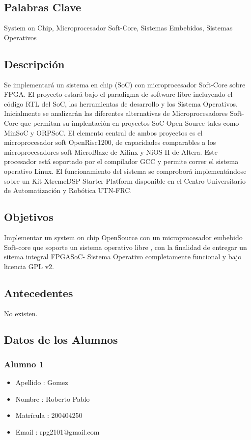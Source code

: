 \documentclass[a4paper,12pt]{article}
\begin{document}
\subsection{Palabras Clave}
System on Chip, Microprocesador Soft-Core, Sistemas Embebidos, Sistemas Operativos
		
\subsection{Descripción}
Se implementará un sistema en chip (SoC) con microprocesador Soft-Core sobre FPGA. El proyecto estará bajo el paradigma de software libre incluyendo
el código RTL del SoC, las herramientas de desarrollo y los Sistema Operativos. Inicialmente se analizarán las diferentes alternativas de
Microprocesadores Soft-Core que permitan su implentación en proyectos SoC Open-Source tales como MinSoC y ORPSoC. El elemento central de
ambos proyectos es el microprocesador soft OpenRisc1200, de capacidades comparables a los microprocesadores soft MicroBlaze de Xilinx y NiOS II de
Altera. Este procesador está soportado por el compilador GCC y permite correr el sistema operativo Linux. El funcionamiento del sistema se comproborá
implementándose sobre un Kit XtremeDSP Starter Platform disponible en el Centro Universitario de Automatización y Robótica UTN-FRC.


\subsection{Objetivos}

Implementar un system on chip OpenSource con un microprocesador embebido Soft-core que soporte un sistema operativo libre , con la finalidad de
entregar un sitema integral FPGASoC- Sistema Operativo completamente funcional y bajo licencia GPL v2.

\subsection{Antecedentes}

No existen.

\subsection{Datos de los Alumnos}
\subsubsection{Alumno 1}
\begin{itemize}
  \item Apellido : Gomez
  \item Nombre : Roberto Pablo
  \item Matrícula : 200404250
  \item Email : rpg2101@gmail.com
\end{itemize} 
\end{document}
